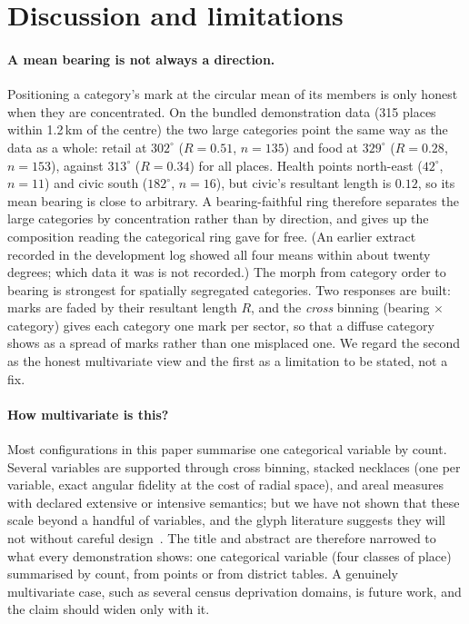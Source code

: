 \section{Discussion and limitations}
\label{sec:discussion}

\paragraph{A mean bearing is not always a direction.} Positioning a
category's mark at the circular mean of its members is only honest when they
are concentrated. On the bundled demonstration data (315 places within
1.2\,km of the centre) the two large categories point the same way as the data
as a whole: retail at $302^\circ$ ($R=0.51$, $n=135$) and food at $329^\circ$
($R=0.28$, $n=153$), against $313^\circ$ ($R=0.34$) for all places. Health
points north-east ($42^\circ$, $n=11$) and civic south ($182^\circ$, $n=16$), but
civic's resultant length is $0.12$, so its mean bearing is close to arbitrary.
A bearing-faithful ring therefore separates the large categories by
concentration rather than by direction, and gives up the composition reading
the categorical ring gave for free. (An earlier extract recorded in the development log showed all four means within
about twenty degrees; which data it was is not recorded.) The morph from category
order to bearing is strongest for spatially segregated categories. Two responses are built: marks are faded
by their resultant length $R$, and the \emph{cross} binning (bearing
$\times$ category) gives each category one mark per sector, so that a diffuse
category shows as a spread of marks rather than one misplaced one. We regard
the second as the honest multivariate view and the first as a limitation to be
stated, not a fix.

\paragraph{How multivariate is this?} Most configurations in this paper
summarise one categorical variable by count. Several variables are supported
through cross binning, stacked necklaces (one per variable, exact angular
fidelity at the cost of radial space), and areal measures with declared
extensive or intensive semantics; but we have not shown that these scale beyond
a handful of variables, and the glyph literature suggests they will not
without careful design~\cite{borgo2013glyph,fuchs2017glyph}. The title and
abstract are therefore narrowed to what every demonstration shows: one
categorical variable (four classes of place) summarised by count, from points
or from district tables. A genuinely multivariate case, such as several census
deprivation domains, is future work, and the claim should widen only with
it.

